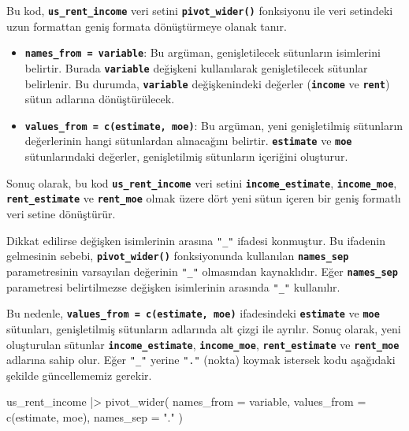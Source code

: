 \documentclass[
  letterpaper,
  DIV=11,
  numbers=noendperiod]{scrreprt}
\newenvironment{Shaded}{\begin{snugshade}}{\end{snugshade}}
\newcommand{\AttributeTok}[1]{\textcolor[rgb]{0.40,0.45,0.13}{#1}}
\newcommand{\FunctionTok}[1]{\textcolor[rgb]{0.28,0.35,0.67}{#1}}
\newcommand{\NormalTok}[1]{\textcolor[rgb]{0.00,0.23,0.31}{#1}}
\newcommand{\SpecialCharTok}[1]{\textcolor[rgb]{0.37,0.37,0.37}{#1}}
\newcommand{\StringTok}[1]{\textcolor[rgb]{0.13,0.47,0.30}{#1}}
\begin{document}
Bu kod, \textbf{\texttt{us\_rent\_income}} veri setini
\textbf{\texttt{pivot\_wider()}} fonksiyonu ile veri setindeki uzun
formattan geniş formata dönüştürmeye olanak tanır.

\begin{itemize}
\item
  \textbf{\texttt{names\_from\ =\ variable}}: Bu argüman, genişletilecek
  sütunların isimlerini belirtir. Burada \textbf{\texttt{variable}}
  değişkeni kullanılarak genişletilecek sütunlar belirlenir. Bu durumda,
  \textbf{\texttt{variable}} değişkenindeki değerler
  (\textbf{\texttt{income}} ve \textbf{\texttt{rent}}) sütun adlarına
  dönüştürülecek.
\item
  \textbf{\texttt{values\_from\ =\ c(estimate,\ moe)}}: Bu argüman, yeni
  genişletilmiş sütunların değerlerinin hangi sütunlardan alınacağını
  belirtir. \textbf{\texttt{estimate}} ve \textbf{\texttt{moe}}
  sütunlarındaki değerler, genişletilmiş sütunların içeriğini oluşturur.
\end{itemize}

Sonuç olarak, bu kod \textbf{\texttt{us\_rent\_income}} veri setini
\textbf{\texttt{income\_estimate}}, \textbf{\texttt{income\_moe}},
\textbf{\texttt{rent\_estimate}} ve \textbf{\texttt{rent\_moe}} olmak
üzere dört yeni sütun içeren bir geniş formatlı veri setine dönüştürür.

Dikkat edilirse değişken isimlerinin arasına \texttt{"\_"} ifadesi
konmuştur. Bu ifadenin gelmesinin sebebi,
\textbf{\texttt{pivot\_wider()}} fonksiyonunda kullanılan
\textbf{\texttt{names\_sep}} parametresinin varsayılan değerinin
\texttt{"\_"} olmasından kaynaklıdır. Eğer \textbf{\texttt{names\_sep}}
parametresi belirtilmezse değişken isimlerinin arasında \texttt{"\_"}
kullanılır.

Bu nedenle, \textbf{\texttt{values\_from\ =\ c(estimate,\ moe)}}
ifadesindeki \textbf{\texttt{estimate}} ve \textbf{\texttt{moe}}
sütunları, genişletilmiş sütunların adlarında alt çizgi ile ayrılır.
Sonuç olarak, yeni oluşturulan sütunlar
\textbf{\texttt{income\_estimate}}, \textbf{\texttt{income\_moe}},
\textbf{\texttt{rent\_estimate}} ve \textbf{\texttt{rent\_moe}} adlarına
sahip olur. Eğer \texttt{"\_"} yerine \texttt{"."} (nokta) koymak
istersek kodu aşağıdaki şekilde güncellememiz gerekir.

\begin{Shaded}
\begin{Highlighting}[]
\NormalTok{us\_rent\_income }\SpecialCharTok{|\textgreater{}} 
  \FunctionTok{pivot\_wider}\NormalTok{(}
    \AttributeTok{names\_from =}\NormalTok{ variable,}
    \AttributeTok{values\_from =} \FunctionTok{c}\NormalTok{(estimate, moe),}
    \AttributeTok{names\_sep =} \StringTok{"."}
\NormalTok{  )}
\end{Highlighting}
\end{Shaded}
\end{document}
